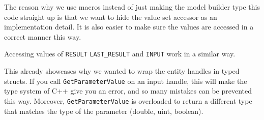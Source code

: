 \documentclass[11pt]{article}
\theoremstyle{definition}
\begin{document}
The reason why we use macros instead of just making the model builder type this code straight up is that we want to hide the value set accessor as an implementation detail. It is also easier  to make sure the values are accessed in a correct manner this way.

Accessing values of {\tt RESULT} {\tt LAST\_RESULT} and {\tt INPUT} work in a similar way.

This already showcases why we wanted to wrap the entity handles in typed structs. If you call {\tt GetParameterValue} on an input handle, this will make the type system of C++ give you an error, and so many mistakes can be prevented this way. Moreover, {\tt GetParameterValue} is overloaded to return a different type that matches the type of the parameter (double, uint, boolean).
\end{document}
